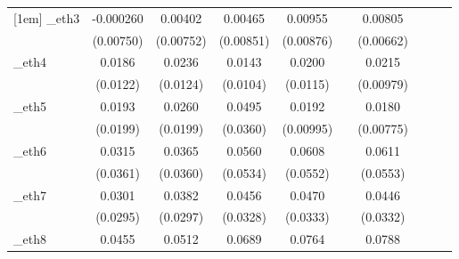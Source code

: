 \begin{table}[htbp]
\begin{tabular}{l*{9}{c}}
[1em]
\_eth3       &   -0.000260         &     0.00402         &     0.00465         &     0.00955         &                     &     0.00805         &                     &                     &                     \\
            &   (0.00750)         &   (0.00752)         &   (0.00851)         &   (0.00876)         &                     &   (0.00662)         &                     &                     &                     \\
[1em]
\_eth4       &      0.0186         &      0.0236\sym{*}  &      0.0143         &      0.0200\sym{*}  &                     &      0.0215\sym{**} &                     &                     &                     \\
            &    (0.0122)         &    (0.0124)         &    (0.0104)         &    (0.0115)         &                     &   (0.00979)         &                     &                     &                     \\
[1em]
\_eth5       &      0.0193         &      0.0260         &      0.0495         &      0.0192\sym{*}  &                     &      0.0180\sym{**} &                     &                     &                     \\
            &    (0.0199)         &    (0.0199)         &    (0.0360)         &   (0.00995)         &                     &   (0.00775)         &                     &                     &                     \\
[1em]
\_eth6       &      0.0315         &      0.0365         &      0.0560         &      0.0608         &                     &      0.0611         &                     &                     &                     \\
            &    (0.0361)         &    (0.0360)         &    (0.0534)         &    (0.0552)         &                     &    (0.0553)         &                     &                     &                     \\
[1em]
\_eth7       &      0.0301         &      0.0382         &      0.0456         &      0.0470         &                     &      0.0446         &                     &                     &                     \\
            &    (0.0295)         &    (0.0297)         &    (0.0328)         &    (0.0333)         &                     &    (0.0332)         &                     &                     &                     \\
[1em]
\_eth8       &      0.0455         &      0.0512         &      0.0689\sym{*}  &      0.0764\sym{*}  &                     &      0.0788\sym{*}  &                     &                     &                     \\

\end{tabular}
\end{table}
